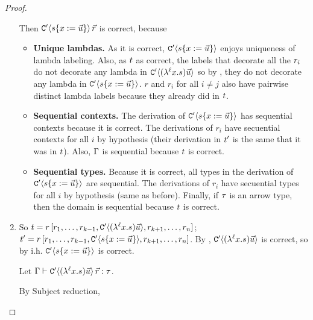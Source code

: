 \begin{proof}
\begin{enumerate}
Then $\mathtt{C}'\langle s\{x := \vec{u}\}\rangle\,\vec{r}$ is correct, because
\begin{itemize}
\item {\bf Unique lambdas.}
      As it is correct, $\mathtt{C}'\langle s\{x := \vec{u}\}\rangle$ enjoys uniqueness of lambda labeling.
      Also, as $t$ as correct, the labels that decorate all the $r_i$ do not decorate any lambda in 
        $\mathtt{C}'\langle(\lambda^{\ell} x. s) \vec{u}\rangle$
      so by , they do not decorate any lambda in
        $\mathtt{C}'\langle s\{x := \vec{u}\}\rangle$. $r$ and $r_i$ for all $i \neq j$ also have
        pairwise distinct lambda labels because they already did in $t$.
\item {\bf Sequential contexts.}
      The derivation of $\mathtt{C}'\langle s\{x := \vec{u}\}\rangle$ has sequential contexts because
      it is correct.
      The derivations of $r_i$ have secuential contexts for all $i$ by hypothesis
      (their derivation in $t'$ is the same that it was in $t$).
      Also, $\Gamma$ is sequential because $t$ is correct.
\item {\bf Sequential types.} Because it is correct, all types in the derivation of
          $\mathtt{C}'\langle s\{x := \vec{u}\}\rangle$
      are sequential.
      The derivations of $r_i$ have secuential types for all $i$ by hypothesis (same as before).
      Finally, if $\tau$ is an arrow type, then the domain is sequential because $t$ is correct.
\end{itemize}
\item {}

  So $t = r\,
    [r_1,\hdots, r_{k-1}, \mathtt{C}'\langle(\lambda^{\ell} x. s) \vec{u}\rangle, r_{k+1},
    \hdots,r_n]$;
    $t' = r\,[r_1,\hdots, r_{k-1}, \mathtt{C}'\langle s\{x := \vec{u}\}\rangle, r_{k+1}, \hdots,r_n]$.
  By , $\mathtt{C}'\langle(\lambda^{\ell} x. s) \vec{u}\rangle$
    is correct, so by i.h. $\mathtt{C}'\langle s\{x := \vec{u}\}\rangle$ is correct.

  Let
    $\Gamma \vdash \mathtt{C}'\langle(\lambda^{\ell} x. s) \vec{u}\rangle\,\vec{r} : \tau$.

By Subject reduction,



\end{enumerate}
\end{proof}
